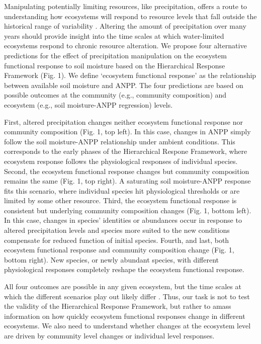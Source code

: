 \documentclass[fleqn,10pt,lineno]{wlpeerj} %
\begin{document}
Manipulating potentially limiting resources, like precipitation, offers
a route to understanding how ecosystems will respond to resource levels
that fall outside the historical range of variability
\citep{Avolio2015, Gherardi2015, Knapp2017}. Altering the amount of
precipitation over many years should provide insight into the time
scales at which water-limited ecosystems respond to chronic resource
alteration. We propose four alternative predictions for the effect of
precipitation manipulation on the ecosystem functional response to soil
moisture based on the Hierarchical Response Framework (Fig. 1). We
define `ecosystem functional response' as the relationship between
available soil moisture and ANPP. The four predictions are based on
possible outcomes at the community (e.g., community composition) and
ecosystem (e.g., soil moisture-ANPP regression) levels.

First, altered precipitation changes neither ecosystem functional
response nor community composition (Fig. 1, top left). In this case,
changes in ANPP simply follow the soil moisture-ANPP relationship under
ambient conditions. This corresponds to the early phases of the
Hierarchical Respone Framework, where ecosystem response follows the
physiological responses of individual species. Second, the ecosystem
functional response changes but community composition remains the same
(Fig. 1, top right). A saturating soil moisture-ANPP response fits this
scenario, where individual species hit physiological thresholds or are
limited by some other resource. Third, the ecosystem functional response
is consistent but underlying community composition changes (Fig. 1,
bottom left). In this case, changes in species' identities or abundances
occur in response to altered precipitation levels and species more
suited to the new conditions compensate for reduced function of initial
species. Fourth, and last, both ecosystem functional response and
community composition change (Fig. 1, bottom right). New species, or
newly abundant species, with different physiological responses
completely reshape the ecosystem functional response.

All four outcomes are possible in any given ecosystem, but the time
scales at which the different scenarios play out likely differ
\citep{Smith2009, Wilcox2016, Knapp2017}. Thus, our task is not to test
the validity of the Hierarchical Response Framework, but rather to amass
information on how quickly ecosystem functional responses change in
different ecosystems. We also need to understand whether changes at the
ecosystem level are driven by community level changes or individual
level responses.
\end{document}

